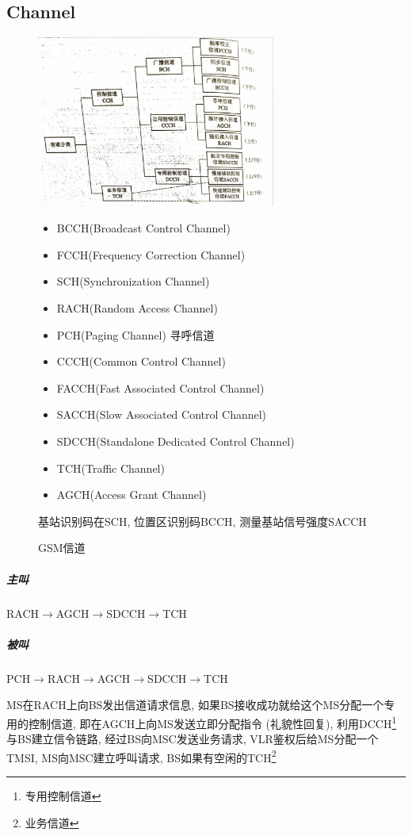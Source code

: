 \documentclass[a4paper]{report}
\begin{document}
\subsection{Channel}
\begin{figure}[H]
\centering
\includegraphics[width=0.7\textwidth]{gsm_chann.jpg}
\caption{GSM信道}
\begin{itemize}
	\item BCCH(Broadcast Control Channel)
	\item FCCH(Frequency Correction Channel)
	\item SCH(Synchronization Channel)
	\item RACH(Random Access Channel)
	\item PCH(Paging Channel) 寻呼信道
	\item CCCH(Common Control Channel)
	\item FACCH(Fast Associated Control Channel)
	\item SACCH(Slow Associated Control Channel)
	\item SDCCH(Standalone Dedicated Control Channel)
	\item TCH(Traffic Channel)
	\item AGCH(Access Grant Channel)
\end{itemize}
基站识别码在SCH, 位置区识别码BCCH, 测量基站信号强度SACCH

\end{figure}
\subparagraph{主叫} RACH$\rightarrow$AGCH$\rightarrow$SDCCH$\rightarrow$TCH
\subparagraph{被叫} PCH$\rightarrow$RACH$\rightarrow$AGCH$\rightarrow$SDCCH$\rightarrow$TCH

MS在RACH上向BS发出信道请求信息, 如果BS接收成功就给这个MS分配一个专用的控制信道, 即在AGCH上向MS发送立即分配指令 (礼貌性回复), 利用DCCH\footnote{专用控制信道}与BS建立信令链路, 经过BS向MSC发送业务请求, VLR鉴权后给MS分配一个TMSI, MS向MSC建立呼叫请求, BS如果有空闲的TCH\footnote{业务信道}
\end{document}
